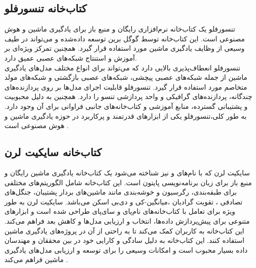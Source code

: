
\subsection[کتاب‌خانه تنسورفلو]{کتاب‌خانه تنسورفلو ‌\protect{}}
تنسورفلو یک کتاب‌خانه نرم‌افزاری رایگان و منبع باز برای یادگیری ماشین و هوش مصنوعی است. این کتاب‌خانه توسط گوگل برین توسعه داده‌شده و می‌تواند در طیف وسیعی 
از وظایف یادگیری ماشین مورد استفاده قرار گیرد. همچنین تمرکز ویژه‌ای بر آموزش و استنتاج شبکه‌های عصبی عمیق دارد. 
\\
تنسورفلو انعطاف‌پذیری بالایی دارد که می‌تواند برای انواع مختلف مدل‌های یادگیری ماشین از جمله شبکه‌های عصبی پیچشی، شبکه‌های عصبی بازگشتی و شبکه‌های مولد متخاصم مورد استفاده قرار گیرد.
تنسورفلو قابلیت اجرای مدل‌ها بر روی پردازنده‌های چندگانه، پردازنده‌های گرافیکی و واحد پردازشی تنسو را دارد. همچنین به دلیل محبوبیت و پشتیبانی گسترده،
منابع آموزشی و کتاب‌خانه‌های جانبی فراوانی برای آن وجود دارد. به طور کلی،تنسورفلو یکی از ابزارهای قدرتمند و پرکاربرد در حوزه یادگیری ماشین و هوش مصنوعی است \cite{Introduc60:online}.


\subsection[کتاب‌خانه سایکیت لرن]{کتاب‌خانه سایکیت لرن\protect{}}
سایکیت لرن که با نام‌های  و  نیز شناخته می‌شود یک کتاب‌خانه یادگیری ماشین رایگان و منبع باز برای زبان برنامه‌نویسی پایتون است. این کتاب‌خانه شامل الگوریتم‌های مختلفی برای طبقه‌بندی،
رگرسیون و خوشه‌بندی مانند ماشین‌های بردار پشتیبان، جنگل‌های تصادفی
، تقویت گرادیان
،میانگین-کی  و دی‌بی اسکن می‌باشد. سایکیت لرن به طور ویژه برای تعامل با
کتاب‌خانه‌های  نام‌پای و سای‌پای طراحی شده است و ابزارهای متنوعی برای پیش‌پردازش داده‌ها، انتخاب و ارزیابی مدل‌ها و کاهش بعد فراهم می‌کند. این کتاب‌خانه به کاربران کمک می‌کند تا به راحتی از آن در پروژه‌های 
یادگیری ماشین استفاده کنند. این کتاب‌خانه به دلیل سادگی و کارایی خود در بین محققان و مهندسان داده بسیار محبوب است و امکانات وسیعی را برای توسعه و ارزیابی مدل‌های یادگیری ماشین فراهم می‌کند \cite{scikitle22:online}.

